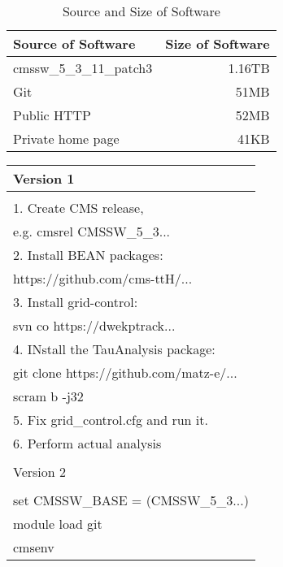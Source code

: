\documentclass{acm_proc_article-sp}
\begin{document}
\begin{table}
    \centering
    \begin{tabular}{|l|r|}
        \hline
        Source of Software & Size of Software \\ \hline
        cmssw\_5\_3\_11\_patch3 & 1.16TB \\ \hline
        Git & 51MB \\ \hline
        Public HTTP & 52MB \\ \hline
        Private home page & 41KB \\ \hline
    \end{tabular}
    \caption{Source and Size of Software}
    \label{table:software-source-size}
\end{table}

\begin{table}
    \centering
    \begin{tabular}{|l|}
        \hline
        Version 1\\ \hline
        \\
        1. Create CMS release,\\
            \hspace{9pt} e.g. cmsrel CMSSW\_5\_3... \\
        2. Install BEAN packages: \\
            \hspace{9pt} https://github.com/cms-ttH/...\\
        3. Install grid-control: \\ 
            \hspace{9pt} svn co https://dwekptrack... \\
        4. INstall the TauAnalysis package: \\
           \hspace{9pt} git clone https://github.com/matz-e/... \\
           \hspace{9pt} scram b -j32 \\
        5. Fix grid\_control.cfg and run it. \\
        6. Perform actual analysis \\ 
        \\ \hline
        Version 2\\ \hline
        \\
        set CMSSW\_BASE = (CMSSW\_5\_3...) \\
        module load git \\        
        cmsenv \\ 

\end{tabular}
\end{table}
\end{document}
